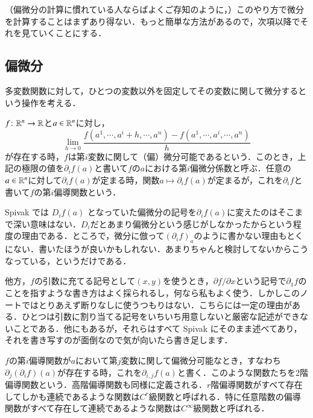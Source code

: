 （偏微分の計算に慣れている人ならばよくご存知のように，）このやり方で微分を計算することはまずあり得ない．もっと簡単な方法があるので，次項以降でそれを見ていくことにする．

\subsection{偏微分}

多変数関数に対して，ひとつの変数以外を固定してその変数に関して微分するという操作を考える．

\begin{defi}
$f \colon \mathbb{R}^n \to \mathbb{R}$と$a \in \mathbb{R}^n$に対し，
\begin{equation}
\lim_{h \to 0} \frac{f(a^1, \cdots, a^i+h, \cdots, a^n) - f(a^1 , \cdots, a^i, \cdots, a^n)}{h}
\end{equation}が存在する時，$f$は第$i$変数に関して（偏）微分可能であるという．このとき，上記の極限の値を$\partial_i f (a)$と書いて$f$の$a$における第$i$偏微分係数と呼ぶ．任意の$a \in \mathbb{R}^n$に対して$\partial_i f(a)$が定まる時，関数$a \mapsto \partial_i f(a)$が定まるが，これを$\partial_i f$と書いて$f$の第$i$偏導関数という．
\end{defi}

\begin{dig}
Spivak では $D_i f(a)$ となっていた偏微分の記号を$\partial_i f(a)$に変えたのはそこまで深い意味はない．$D_i$だとあまり偏微分という感じがしなかったからという程度の理由である．ところで，微分に倣って$(\partial_i f)_a$のように書かない理由もとくにない．書いたほうが良いかもしれない．あまりちゃんと検討してないからこうなっている，というだけである．

他方，$f$の引数に充てる記号として$(x,y)$を使うとき，$\partial f/\partial x$という記号で$\partial_1 f$のことを指すような書き方はよく採られるし，何なら私もよく使う．しかしこのノートではとりあえず断りなしに使うつもりはない．こちらには一定の理由がある．ひとつは引数に割り当てる記号をいちいち用意しないと厳密な記述ができないことである．他にもあるが，それらはすべて Spivak にそのまま述べてあり，それを書き写すのが面倒なので気が向いたら書き足します．
\end{dig}

\begin{defi}
$f$の第$i$偏導関数が$a$において第$j$変数に関して偏微分可能なとき，すなわち$\partial_j (\partial_i f)(a)$が存在する時，これを$\partial_{i,j}f(a)$と書く．このような関数たちを2階偏導関数という．高階偏導関数も同様に定義される．$r$階偏導関数がすべて存在してしかも連続であるような関数は$C^r$級関数と呼ばれる．特に任意階数の偏導関数がすべて存在して連続であるような関数は$C^\infty$級関数と呼ばれる．
\end{defi}

